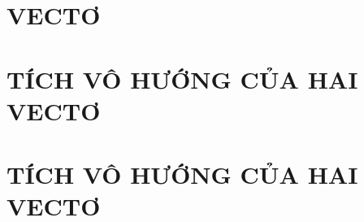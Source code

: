 \documentclass[12pt,a4paper,twoside]{book}
\theoremstyle{nonumberplain}
\begin{document}
\tableofcontents
\chapter{VECTƠ}
\setcounter{ex}{0}
	
	
	
	
	


\chapter{TÍCH VÔ HƯỚNG CỦA HAI VECTƠ}
\setcounter{ex}{0}
	
	
	
	


\chapter{TÍCH VÔ HƯỚNG CỦA HAI VECTƠ}
\setcounter{ex}{0}
	
	
	
	
\end{document}
